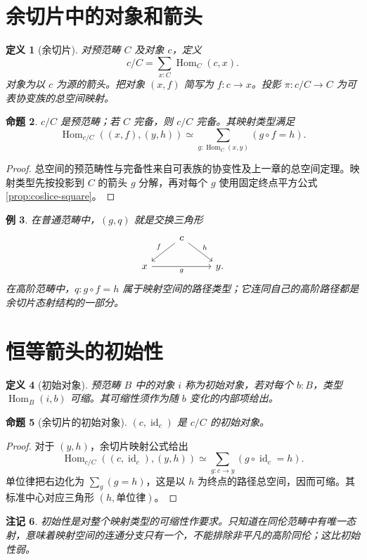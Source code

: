 \documentclass[12pt,oneside,openany,fontset=none]{ctexbook}
\theoremstyle{cn}
\newtheorem{definition}{定义}[chapter]
\newtheorem{example}[definition]{例}
\newtheorem{proposition}[definition]{命题}
\newtheorem{remark}[definition]{注记}
\numberwithin{equation}{chapter}
\newcommand{\id}{\operatorname{id}}
\newcommand{\Hom}{\operatorname{Hom}}
\begin{document}
\section{余切片中的对象和箭头}
\begin{definition}[余切片]
对预范畴 $C$ 及对象 $c$，定义
\[
c/C=\sum_{x:C}\Hom_C(c,x).
\]
对象为以 $c$ 为源的箭头。把对象 $(x,f)$ 简写为 $f:c\to x$。投影 $\pi:c/C\to C$ 为可表协变族的总空间映射。
\end{definition}
\begin{proposition}
$c/C$ 是预范畴；若 $C$ 完备，则 $c/C$ 完备。其映射类型满足
\[
\Hom_{c/C}((x,f),(y,h))
\simeq\sum_{g:\Hom_C(x,y)}(g\circ f=h).
\]
\end{proposition}
\begin{proof}
总空间的预范畴性与完备性来自可表族的协变性及上一章的总空间定理。映射类型先按投影到 $C$ 的箭头 $g$ 分解，再对每个 $g$ 使用固定终点平方公式\ref{prop:coslice-square}。
\end{proof}
\begin{example}
在普通范畴中，$(g,q)$ 就是交换三角形
\[
\begin{tikzcd}
&c\ar[dl,"f"']\ar[dr,"h"]&\\
x\ar[rr,"g"']&&y.
\end{tikzcd}
\]
在高阶范畴中，$q:g\circ f=h$ 属于映射空间的路径类型；它连同自己的高阶路径都是余切片态射结构的一部分。
\end{example}

\section{恒等箭头的初始性}
\begin{definition}[初始对象]
预范畴 $B$ 中的对象 $i$ 称为初始对象，若对每个 $b:B$，类型 $\Hom_B(i,b)$ 可缩。其可缩性须作为随 $b$ 变化的内部项给出。
\end{definition}
\begin{proposition}[余切片的初始对象]\label{prop:coslice-initial}
$(c,\id_c)$ 是 $c/C$ 的初始对象。
\end{proposition}
\begin{proof}
对于 $(y,h)$，余切片映射公式给出
\[
\Hom_{c/C}((c,\id_c),(y,h))
\simeq\sum_{g:c\to y}(g\circ\id_c=h).
\]
单位律把右边化为 $\sum_g(g=h)$，这是以 $h$ 为终点的路径总空间，因而可缩。其标准中心对应三角形 $(h,\text{单位律})$。
\end{proof}
\begin{remark}
初始性是对整个映射类型的可缩性作要求。只知道在同伦范畴中有唯一态射，意味着映射空间的连通分支只有一个，不能排除非平凡的高阶同伦；这比初始性弱。
\end{remark}
\end{document}
